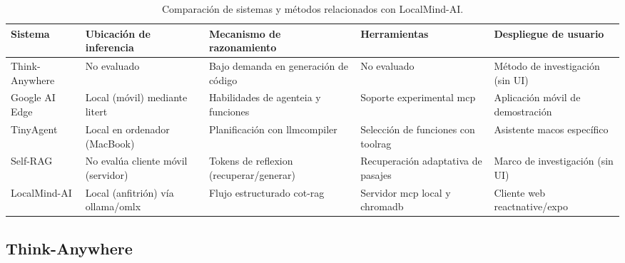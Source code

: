     {\scriptsize
        \setlength{\tabcolsep}{4pt}
        \renewcommand{\arraystretch}{1.1}
        \begin{table}
            \centering
            \begin{tabularx}{\textwidth}{|p{3.8cm}|p{3.5cm}|X|X|p{4.2cm}|}
                \hline
                \textbf{Sistema}                              & \textbf{Ubicación de inferencia}              & \textbf{Mecanismo de razonamiento}            & \textbf{Herramientas}                     & \textbf{Despliegue de usuario}           \\ \hline
                Think-Anywhere \cite{jiang2026thinkanywhere}  & No evaluado                                   & Bajo demanda en generación de código          & No evaluado                               & Método de investigación (sin UI)         \\ \hline
                Google AI Edge \cite{google2026aiedgegallery} & Local (móvil) mediante \gls{litert}           & Habilidades de \gls{agenteia} y funciones     & Soporte experimental \gls{mcp}            & Aplicación móvil de demostración         \\ \hline
                TinyAgent \cite{erdogan2024tinyagent}         & Local en ordenador (MacBook)                  & Planificación con \gls{llmcompiler}           & Selección de funciones con \gls{toolrag}  & Asistente \gls{macos} específico         \\ \hline
                Self-RAG \cite{asai2024selfrag}               & No evalúa cliente móvil (servidor)            & Tokens de \gls{reflexion} (recuperar/generar) & Recuperación adaptativa de pasajes        & Marco de investigación (sin UI)          \\ \hline
                LocalMind-AI                                  & Local (anfitrión) vía \gls{ollama}/\gls{omlx} & Flujo estructurado \gls{cot}-\gls{rag}        & Servidor \gls{mcp} local y \gls{chromadb} & Cliente web \gls{reactnative}/\gls{expo} \\ \hline
            \end{tabularx}
            \caption{Comparación de sistemas y métodos relacionados con LocalMind-AI.}
            \label{tab:comparativa-sistemas-localmind}
        \end{table}
    }

\subsection{Think-Anywhere}\label{subsec:think-anywhere}

